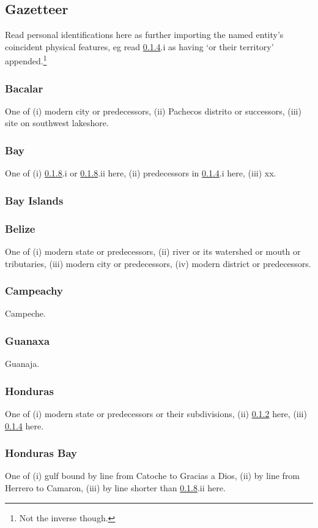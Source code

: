 \documentclass{amsart}
\theoremstyle{definition}%
\theoremstyle{definition}%
\theoremstyle{remark}%
\begin{document}
\subsection{Gazetteer} Read personal identifications here as further importing the named entity's coincident physical features, eg read \ref{term:bz}.i as having `or their territory' appended.\footnote{Not the inverse though.}
%
\subsubsection{Bacalar} One of (i) modern city or predecessors, (ii) Pachecos distrito or successors, (iii) site on southwest lakeshore.
%
\subsubsection{Bay}\label{term:bay} One of (i) \ref{term:hondbay}.i or \ref{term:hondbay}.ii here, (ii) predecessors in \ref{term:bz}.i here, (iii) xx.
%
\subsubsection{Bay Islands}
%
\subsubsection{Belize}\label{term:bz} One of (i) modern state or predecessors, (ii) river or its watershed or mouth or tributaries, (iii) modern city or predecessors, (iv) modern district or predecessors.
%
\subsubsection{Campeachy} Campeche.
%
\subsubsection{Guanaxa} Guanaja.%
%
\subsubsection{Honduras} One of (i) modern state or predecessors or their subdivisions, (ii) \ref{term:bay} here, (iii) \ref{term:bz} here.
%
\subsubsection{Honduras Bay}\label{term:hondbay} One of (i) gulf bound by line from Catoche to Gracias a Dios, (ii) by line from Herrero to Camaron, (iii) by line shorter than \ref{term:hondbay}.ii here.
%
\end{document}
